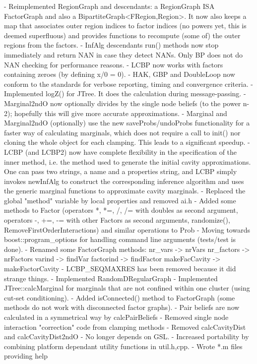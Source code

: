 \begin{DoxyVerbInclude}
- Reimplemented RegionGraph and descendants: a RegionGraph ISA FactorGraph
  and also a BipartiteGraph<FRegion,Region>. It now also keeps a map that
  associates outer region indices to factor indices (no powers yet, this
  is deemed superfluous) and provides functions to recompute (some of) the
  outer regions from the factors.
- InfAlg descendants run() methods now stop immediately and return NAN in case
  they detect NANs. Only BP does not do NAN checking for performance reasons.
- LCBP now works with factors containing zeroes (by defining x/0 = 0).
- HAK, GBP and DoubleLoop now conform to the standards for verbose reporting,
  timing and convergence criteria.
- Implemented logZ() for JTree. It does the calculation during message-passing.
- Marginal2ndO now optionally divides by the single node beliefs (to the power n-2);
  hopefully this will give more accurate approximations.
- Marginal and Marginal2ndO (optionally) use the new saveProbs/undoProbs functionality
  for a faster way of calculating marginals, which does not require a call to init()
  nor cloning the whole object for each clamping. This leads to a significant speedup.
- LCBP (and LCBP2) now have complete flexibility in the specification of the
  inner method, i.e. the method used to generate the initial cavity approximations.
  One can pass two strings, a name and a properties string, and LCBP simply invokes
  newInfAlg to construct the corresponding inference algorithm and uses the generic
  marginal functions to approximate cavity marginals.
- Replaced the global "method" variable by local properties and removed ai.h
- Added some methods to Factor (operators *, *=, /, /= with doubles as
  second argument, operators -, +=, -= with other Factors as second
  arguments, randomize(), RemoveFirstOrderInteractions) and similar
  operations to Prob
- Moving towards boost::program_options for handling command line arguments
  (tests/test is done).
- Renamed some FactorGraph methods:
  nr_vars       -> nrVars
  nr_factors    -> nrFactors
  varind        -> findVar
  factorind     -> findFactor
  makeFacCavity -> makeFactorCavity
- LCBP_SEQMAXRES has been removed because it did strange things.
- Implemented RandomDRegularGraph
- Implemented JTree::calcMarginal for marginals that are not confined
  within one cluster (using cut-set conditioning).
- Added isConnected() method to FactorGraph (some methods do not work with
  disconnected factor graphs).
- Pair beliefs are now calculated in a symmetrical way by calcPairBeliefs
- Removed single node interaction "correction" code from clamping methods
- Removed calcCavityDist and calcCavityDist2ndO
- No longer depends on GSL.
- Increased portability by combining platform dependant utility functions
  in util.{h,cpp}.
- Wrote *.m files providing help


\end{DoxyVerbInclude}
